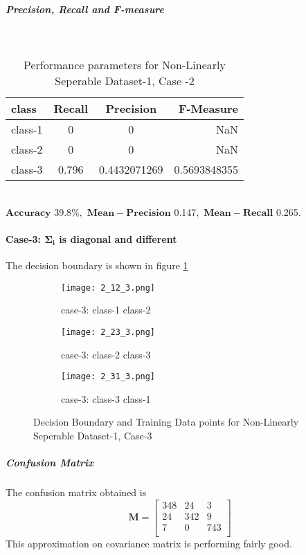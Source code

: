 \documentclass[a4paper]{article}
\begin{document}
\subparagraph{Precision, Recall and F-measure} \textcolor{white}{:}
\begin{table}[h!]
  \begin{center}
    \caption{Performance parameters for Non-Linearly Seperable Dataset-1, Case -2}
    \label{tab:table1}
    \begin{tabular}{l|c|c|r} %
      \textbf{class} & \textbf{Recall} & \textbf{Precision} & \textbf{F-Measure}\\
      \hline
      class-1 & 0 & 0 & NaN\\
      class-2 & 0 & 0 & NaN\\
      class-3 & 0.796 & 0.4432071269 & 0.5693848355\\
    \end{tabular}
  \end{center}
\end{table}
\\
$\mathbf{Accuracy}$ 39.8$\%,$ $\mathbf{Mean- Precision}$ 0.147$,$ $\mathbf{Mean- Recall}$ 0.265$.$
\newpage
\paragraph{Case-3: $\mathbf{\Sigma_{i}}$ is diagonal and different} 
The decision boundary is shown in figure \ref{fig:2_3}
\begin{figure}[h!]
  \centering
  \begin{subfigure}[b]{0.4\linewidth}
    \texttt{[image: 2\_12\_3.png]}
     \caption{case-3: class-1 class-2}
  \end{subfigure}
  \begin{subfigure}[b]{0.4\linewidth}
    \texttt{[image: 2\_23\_3.png]}
    \caption{case-3: class-2 class-3}
  \end{subfigure}
  \begin{subfigure}[b]{0.4\linewidth}
    \texttt{[image: 2\_31\_3.png]}
    \caption{case-3: class-3 class-1}
  \end{subfigure}
  \caption{Decision Boundary and Training Data points for Non-Linearly Seperable Dataset-1, Case-3}
  \label{fig:2_3}
\end{figure}
\subparagraph{Confusion Matrix}
The confusion matrix obtained is
\[
\mathbf{M} = \left[ {\begin{array}{ccc}
348 & 24 & 3\\
24 & 342 & 9\\
7 & 0 & 743\\
\end{array}} \right]
\]This approximation on covariance matrix is performing fairly good.\\
\end{document}

